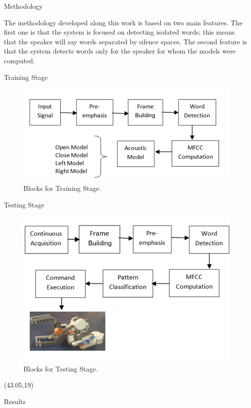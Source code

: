 \documentclass[final]{beamer}
\begin{document}
\begin{frame}{}
\begin{textblock}{39.5}
\begin{block}{Methodology}

The methodology developed along this work is based on two main features. The first one is that the system is focused on detecting isolated words; this means that the speaker will say words separated by silence spaces. The second feature is that the system detects words only for the speaker for whom the models were computed.

Training Stage

\begin{figure}[!ht]
\begin{center}
   \includegraphics[width=0.6\linewidth]{figs/1bloquesTraining}
\end{center}
   \caption{Blocks for Training Stage.}
\label{trainingBlocks}
\end{figure}

Testing Stage

\begin{figure}[!ht]
\begin{center}
   \includegraphics[width=0.6\linewidth]{figs/11bloquesTesting}
\end{center}
   \caption{Blocks for Testing Stage.}
\label{trainingBlocks}
\end{figure}
\end{block}


\end{textblock}

\begin{textblock}{39.5}(43.05,19)

\begin{block}{Results}


\end{block}
\end{textblock}
\end{frame}
\end{document}
